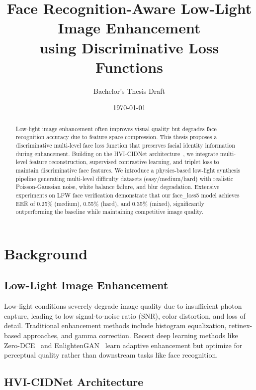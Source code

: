 \documentclass[12pt,a4paper]{article}
\title{\textbf{Face Recognition-Aware Low-Light Image Enhancement\\using Discriminative Loss Functions}}
\author{Bachelor's Thesis Draft}
\date{\today}
\begin{document}
\maketitle

\begin{abstract}
Low-light image enhancement often improves visual quality but degrades face recognition accuracy due to feature space compression. This thesis proposes a discriminative multi-level face loss function that preserves facial identity information during enhancement. Building on the HVI-CIDNet architecture~\cite{yan2025hvi}, we integrate multi-level feature reconstruction, supervised contrastive learning, and triplet loss to maintain discriminative face features. We introduce a physics-based low-light synthesis pipeline generating multi-level difficulty datasets (easy/medium/hard) with realistic Poisson-Gaussian noise, white balance failure, and blur degradation. Extensive experiments on LFW face verification demonstrate that our face_loss5 model achieves EER of 0.25\% (medium), 0.55\% (hard), and 0.35\% (mixed), significantly outperforming the baseline while maintaining competitive image quality.
\end{abstract}

\tableofcontents
\newpage

\section{Background}

\subsection{Low-Light Image Enhancement}

Low-light conditions severely degrade image quality due to insufficient photon capture, leading to low signal-to-noise ratio (SNR), color distortion, and loss of detail. Traditional enhancement methods include histogram equalization, retinex-based approaches, and gamma correction. Recent deep learning methods like Zero-DCE~\cite{guo2020zero} and EnlightenGAN~\cite{chen2020enlightengan} learn adaptive enhancement but optimize for perceptual quality rather than downstream tasks like face recognition.

\subsection{HVI-CIDNet Architecture}
\end{document}

